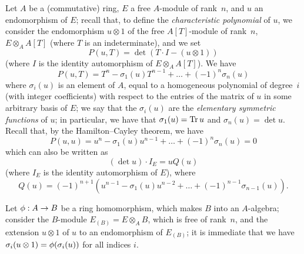 \begin{env}[6.4.1]
\label{II.6.4.1}
Let $A$ be a (commutative) ring, $E$ a free $A$-module of rank~$n$, and $u$ an endomorphism of $E$;
recall that, to define the \emph{characteristic polynomial} of $u$, we consider the endomorphism $u\otimes1$ of the free $A[T]$-module of rank~$n$, $E\otimes_A A[T]$ (where $T$ is an indeterminate), and we set
\[
\label{II.6.4.1.1}
  P(u,T) = \det(T\cdot I-(u\otimes 1))
\tag{6.4.1.1}
\]
(where $I$ is the identity automorphism of $E\otimes_A A[T]$).
We have
\[
\label{II.6.4.1.2}
  P(u,T) = T^n - \sigma_1(u)T^{n-1} + \ldots + (-1)^n\sigma_n(u)
\tag{6.4.1.2}
\]
where $\sigma_i(u)$ is an element of $A$, equal to a homogeneous polynomial of degree~$i$ (with integer coefficients) with respect to the entries of the matrix of $u$ in some arbitrary basis of $E$;
we say that the $\sigma_i(u)$ are the \emph{elementary symmetric functions} of $u$;
in particular, we have that $\sigma_1(u)=\operatorname{Tr} u$ and $\sigma_n(u)=\det u$.
Recall that, by the Hamilton--Cayley theorem, we have
\[
\label{II.6.4.1.3}
  P(u,u) = u^n - \sigma_1(u)u^{n-1} + \ldots + (-1)^n\sigma_n(u) = 0
\tag{6.4.1.3}
\]
which can also be written as
\[
\label{II.6.4.1.4}
  (\det u)\cdot I_E = uQ(u)
\tag{6.4.1.4}
\]
(where $I_E$ is the identity automorphism of $E$), where
\[
\label{II.6.4.1.5}
  Q(u) = (-1)^{n+1}(u^{n-1}-\sigma_1(u)u^{n-2}+\ldots+(-1)^{n-1}\sigma_{n-1}(u)).
\tag{6.4.1.5}
\]

Let $\vphi:A\to B$ be a ring homomorphism, which makes $B$ into an $A$-algebra;
consider the $B$-module $E_{(B)}=E\otimes_A B$, which is free of rank~$n$, and the extension $u\otimes1$ of $u$ to an endomorphism of $E_{(B)}$;
it is immediate that we have $\sigma_i(u\otimes1)=\phi(\sigma_i(u))$ for all indices $i$.
\end{env}

